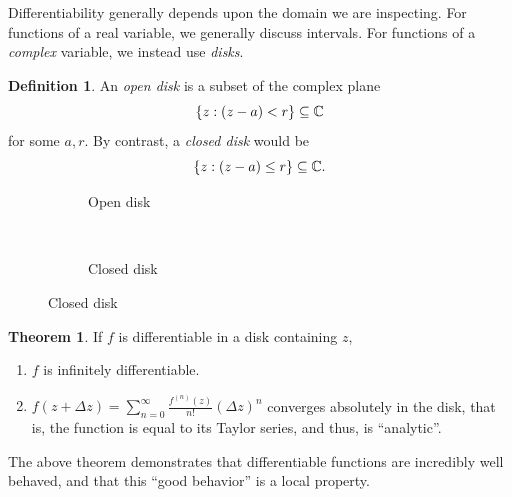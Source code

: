 \documentclass[10pt]{scrartcl}
\newcommand\todoin[2][]{\todo[inline, caption={2do}, #1]{
\begin{minipage}{\textwidth-4pt}TODO: #2\end{minipage}}}
\numberwithin{equation}{subsection}
\theoremstyle{definition}
\newtheorem{definition}{Definition}[section]
\newtheorem{theorem}{Theorem}[section]
\theoremstyle{remark}
\newenvironment{definitionSR}
	{
		\begin{siderules}
			\begin{definition}
			}
			{
			\end{definition}
		\end{siderules}
	}
\newenvironment{theoremSR}
	{
		\begin{siderules}
			\begin{theorem}
			}
			{
			\end{theorem}
		\end{siderules}
	}
\newcommand{\Complex}{\mathbb{C}}
\begin{document}
Differentiability generally depends upon the domain we are inspecting.
For functions of a real variable, we generally discuss intervals.
For functions of a \emph{complex} variable, we instead use \textit{disks}.
\begin{definitionSR}
An \textit{open disk} is a subset of the complex plane
\[
\Bqty{z: (z-a)<r} \subseteq \Complex
\]
for some $a,r$. By contrast, a \textit{closed disk} would be
\[
\Bqty{z: (z-a)\leq r} \subseteq \Complex.
\]
\end{definitionSR}
\begin{figure}[h]
\centering
\begin{subfigure}[b]{.4\textwidth}
\caption{Open disk}
\end{subfigure}
~~
\begin{subfigure}[b]{.4\textwidth}
\caption{Closed disk}
\end{subfigure}
\end{figure}
\todoin{Define a region}
\begin{theoremSR}
If $f$ is differentiable in a disk containing $z$,
\begin{enumerate}
\item $f$ is infinitely differentiable.
\item $f(z+\Delta z) = \sum_{n=0}^\infty \frac{f^{(n)}(z)}{n!} (\Delta z)^n$
converges absolutely in the disk, that is, the function is equal to its Taylor
series, and thus, is ``analytic''.
\end{enumerate}
\end{theoremSR}
The above theorem demonstrates that differentiable functions are incredibly
well behaved, and that this ``good behavior'' is a local property.
\end{document}

